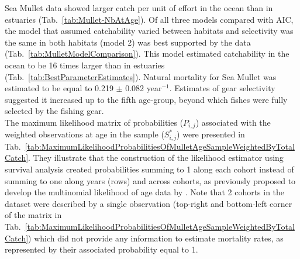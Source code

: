 Sea Mullet data showed larger catch per unit of effort in the ocean than in estuaries (Tab.~\ref{tab:Mullet-NbAtAge}). Of all three models compared with AIC, the model that assumed catchability varied between habitats and selectivity was the same in both habitats (model 2) was best supported by the data (Tab.~\ref{tab:MulletModelComparison}). This model estimated catchability in the ocean to be 16 times larger than in estuaries (Tab.~\ref{tab:BestParameterEstimates}). Natural mortality for Sea Mullet was estimated to be equal to 0.219 $\pm$ 0.082 year$^{-1}$. Estimates of gear selectivity suggested it increased up to the fifth age-group, beyond which fishes were fully selected by the fishing gear.\\

The maximum likelihood matrix of probabilities ($P_{i,j}$) associated with the weighted observations at age in the sample ($S^{*}_{i,j}$) were presented in Tab.~\ref{tab:MaximumLikelihoodProbabilitiesOfMulletAgeSampleWeightedByTotalCatch}. They illustrate that the construction of the likelihood estimator using survival analysis created probabilities summing to 1 along each cohort instead of summing to one along years (rows) and across cohorts, as previously proposed to develop the multinomial likelihood of age data by \cite{Four82a}. Note that 2 cohorts in the dataset were described by a single observation (top-right and bottom-left corner of the matrix in Tab.~\ref{tab:MaximumLikelihoodProbabilitiesOfMulletAgeSampleWeightedByTotalCatch}) which did not provide any information to estimate mortality rates, as represented by their associated probability equal to 1.\\



